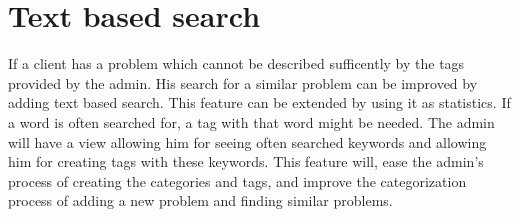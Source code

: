 \section{Text based search}
\label{sec:text_based_search}
If a client has a problem which cannot be described sufficently by the tags provided by the admin. 
His search for a similar problem can be improved by adding text based search. 
This feature can be extended by using it as statistics. If a word is often searched for, a tag with that word might be needed. 
The admin will have a view allowing him for seeing often searched keywords and allowing him for creating tags with these keywords.
This feature will, ease the admin's process of creating the categories and tags, and improve the categorization process of adding a new problem and finding similar problems. 